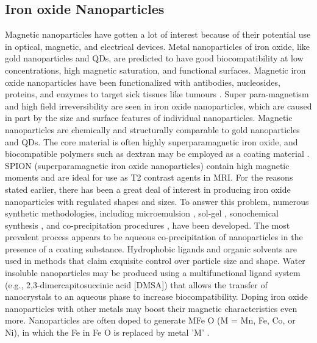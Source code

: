 \documentclass[12pt]{article}
\begin{document}
\subsection*{Iron oxide Nanoparticles}
Magnetic nanoparticles have gotten a lot of interest because of their potential use in optical, magnetic, and electrical devices. Metal nanoparticles of iron oxide, like gold nanoparticles and QDs, are predicted to have good biocompatibility at low concentrations, high magnetic saturation, and functional surfaces. Magnetic iron oxide nanoparticles have been functionalized with antibodies, nucleosides, proteins, and enzymes to target sick tissues like tumours . Super para-magnetism and high field irreversibility are seen in iron oxide nanoparticles, which are caused in part by the size and surface features of individual nanoparticles. Magnetic nanoparticles are chemically and structurally comparable to gold nanoparticles and QDs. The core material is often highly superparamagnetic iron oxide, and biocompatible polymers such as dextran may be employed as a coating material . SPION (superparamagnetic iron oxide nanoparticles) contain high magnetic moments and are ideal for use as T2 contrast agents in MRI.
For the reasons stated earlier, there has been a great deal of interest in producing iron oxide nanoparticles with regulated shapes and sizes. To answer this problem, numerous synthetic methodologies, including microemulsion , sol-gel , sonochemical synthesis , and co-precipitation procedures , have been developed. The most prevalent process appears to be aqueous co-precipitation of nanoparticles in the presence of a coating substance. Hydrophobic ligands and organic solvents are used in methods that claim exquisite control over particle size and shape. Water insoluble nanoparticles may be produced using a multifunctional ligand system (e.g., 2,3-dimercapitosuccinic acid [DMSA]) that allows the transfer of nanocrystals to an aqueous phase to increase biocompatibility. Doping iron oxide nanoparticles with other metals may boost their magnetic characteristics even more. Nanoparticles are often doped to generate MFe O (M = Mn, Fe, Co, or Ni), in which the Fe in Fe O is replaced by metal 'M' .
\end{document}
